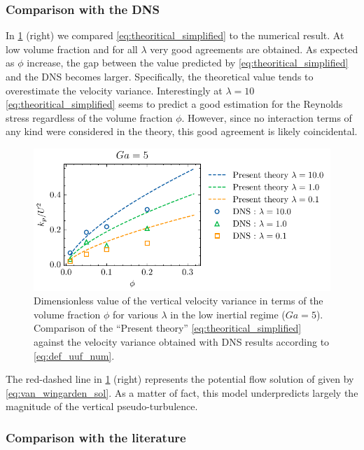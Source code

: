 \subsubsection{Comparison with the DNS}
In \ref{fig:uuyy} (right) we compared \ref{eq:theoritical_simplified} to the numerical result.
At low volume fraction and for all $\lambda$ very good agreements are obtained. 
As expected as $\phi$ increase, the gap between the value predicted by \ref{eq:theoritical_simplified} and the DNS becomes larger.
Specifically, the theoretical value tends to overestimate the velocity variance.   
Interestingly at $\lambda = 10$ \ref{eq:theoritical_simplified} seems to predict a good estimation for the Reynolds stress regardless of the volume fraction $\phi$. 
However, since no interaction terms of any kind were considered in the theory, this good agreement is likely coincidental.
\begin{figure}
    \centering
    \includegraphics[height = 0.25\textwidth]{image/HOMOGENEOUS_final/CA/UUyy_Ga_5.pdf}
    \caption{Dimensionless value of the vertical velocity variance  in terms of the volume fraction $\phi$ for various $\lambda$ in the low inertial regime ($Ga = 5$). 
    Comparison of the ``Present theory'' \eqref{eq:theoritical_simplified} against the velocity variance obtained with DNS results according to \eqref{eq:def_uuf_num}. 
    }
    \label{fig:uuyy}
\end{figure}
The red-dashed line in \ref{fig:uuyy} (right) represents the potential flow solution of \citet{van1998pseudo} given by \ref{eq:van_wingarden_sol}. 
As a matter of fact, this model underpredicts largely the magnitude of the vertical pseudo-turbulence.



\subsubsection{Comparison with the literature}

